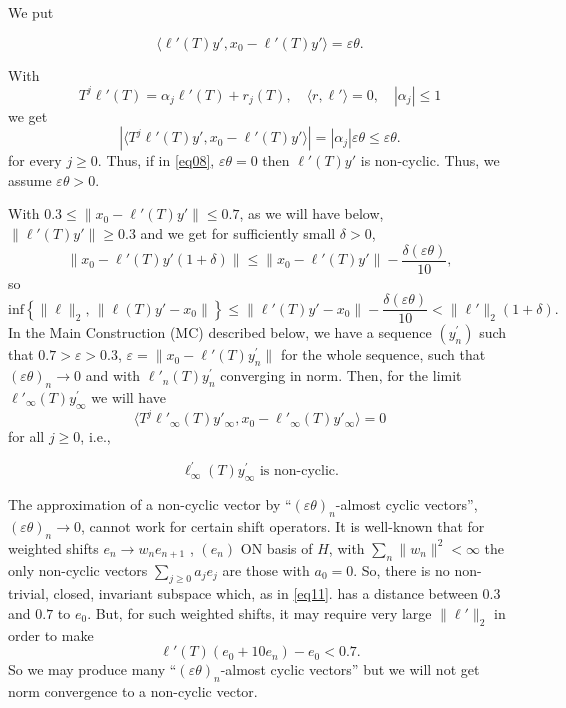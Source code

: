 \documentclass[12pt,oneside,reqno]{amsart}
\theoremstyle{definition}
\begin{document}
We put

\begin{equation}\label{eq08}
\langle \ell'(T) y', x_0 - \ell'(T) y'\rangle = \varepsilon \theta.
\end{equation}

With $$T^j \ell' (T) = \alpha_j \ell'(T) + r_j (T), \quad \langle r, \ell' \rangle = 0, \quad |\alpha_j|\le 1$$ we get
\begin{equation}\label{eq09}
	\left| \langle T^j \ell'(T) y', x_0 - \ell'(T) y' \rangle \right|= |\alpha_j| \varepsilon \theta \le \varepsilon \theta.
\end{equation}
for every $j\ge 0$. Thus, if in \eqref{eq08}, $\varepsilon \theta = 0$ then $\ell'(T) y'$ is non-cyclic. Thus, we assume $\varepsilon \theta > 0$.

With  $0.3 \le \| x_0 - \ell' (T) y' \| \le 0.7$, as we will have below, $\|\ell' (T) y'\| \ge 0.3$ and we get for sufficiently small $\delta >0$, 
$$\| x_0 - \ell'(T) y' (1 + \delta) \| \le \|x_0 - \ell' (T) y' \| - \frac{\delta (\varepsilon \theta)}{10},$$
so 
\begin{equation}\label{eq10}
	\text{inf} \left\{ \| \ell\|_2, \, \|\ell(T) y'- x_0\| \right\} \le \|\ell'(T) y' - x_0 \|  - \frac{\delta (\varepsilon \theta)}{10} < \|\ell'\|_2 (1 + \delta).
\end{equation}
In the Main Construction (MC) described below, we have  a sequence $(y_n^\prime)$ such that $0.7 > \varepsilon > 0.3$, $\varepsilon = \|x_0 - \ell'(T) y_n^\prime\|$ for the whole sequence, such that $(\varepsilon \theta)_n \rightarrow 0$ and with $\ell'_n(T) y_n^\prime$ converging  in norm. Then, for the limit $\ell'_{\infty}(T)y_{\infty}^{\prime}$ we will have 
$$\langle T^j \ell'_{\infty}(T) y'_{\infty}, x_0 - \ell'_{\infty}(T) y'_{\infty}\rangle = 0$$
for all $j \ge 0$, i.e., 

\begin{equation}\label{eq11}
	\ell^{\prime}_{\infty}(T) y_{\infty}^{\prime} \text{ is non-cyclic}.
\end{equation}

The approximation of a non-cyclic vector by ``$(\varepsilon \theta)_n$-almost cyclic vectors'', $(\varepsilon \theta)_n \rightarrow 0$, cannot work for certain shift operators. It is well-known that for weighted shifts $e_n \rightarrow w_n e_{n+1}$ , $(e_n)$ ON basis of $H$, with $\displaystyle \sum_n \|w_n\|^2 < \infty$ the only non-cyclic vectors $\sum_{j \ge 0} a_j e_j$ are those with $a_0 =0$. So, there is no non-trivial, closed, invariant subspace which, as in \eqref{eq11}. has a distance between $0.3$ and $0.7$ to $e_0$. But, for such weighted shifts, it may require very large $\|\ell'\|_2$ in order to make 
$$\ell'(T) (e_0 + 10 e_n) - e_0 < 0.7.$$
So we may produce many ``$(\varepsilon \theta)_n$-almost cyclic vectors'' but we will not get norm convergence to a non-cyclic vector.
\end{document}

